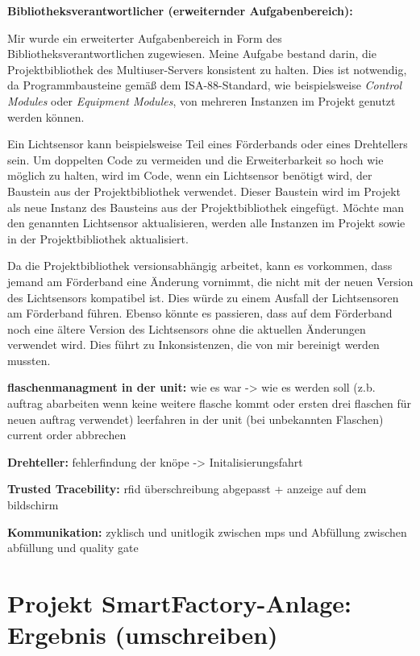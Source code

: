\textbf{Bibliotheksverantwortlicher (erweiternder Aufgabenbereich):} 

Mir wurde ein erweiterter Aufgabenbereich in Form des Bibliotheksverantwortlichen zugewiesen. Meine Aufgabe bestand darin, 
die Projektbibliothek des Multiuser-Servers konsistent zu halten. Dies ist notwendig, da Programmbausteine gemäß dem 
ISA-88-Standard, wie beispielsweise \textit{Control Modules} oder \textit{Equipment Modules}, von mehreren Instanzen im 
Projekt genutzt werden können.

Ein Lichtsensor kann beispielsweise Teil eines Förderbands oder eines Drehtellers sein. Um doppelten Code zu vermeiden und 
die Erweiterbarkeit so hoch wie möglich zu halten, wird im Code, wenn ein Lichtsensor benötigt wird, der Baustein aus der 
Projektbibliothek verwendet. Dieser Baustein wird im Projekt als neue Instanz des Bausteins aus der Projektbibliothek 
eingefügt. Möchte man den genannten Lichtsensor aktualisieren, werden alle Instanzen im Projekt sowie in der 
Projektbibliothek aktualisiert.

Da die Projektbibliothek versionsabhängig arbeitet, kann es vorkommen, dass jemand am Förderband eine Änderung vornimmt, die 
nicht mit der neuen Version des Lichtsensors kompatibel ist. Dies würde zu einem Ausfall der Lichtsensoren am Förderband 
führen. Ebenso könnte es passieren, dass auf dem Förderband noch eine ältere Version des Lichtsensors ohne die aktuellen 
Änderungen verwendet wird. Dies führt zu Inkonsistenzen, die von mir bereinigt werden mussten.

\textbf{flaschenmanagment in der unit:} 
wie es war -> wie es werden soll (z.b. auftrag abarbeiten wenn keine weitere flasche kommt oder ersten drei flaschen für neuen auftrag verwendet)
leerfahren in der unit (bei unbekannten Flaschen)
current order abbrechen 

\textbf{Drehteller:} 
fehlerfindung der knöpe -> Initalisierungsfahrt 

\textbf{Trusted Tracebility:} 
rfid überschreibung abgepasst + anzeige auf dem bildschirm 

\textbf{Kommunikation:} 
zyklisch und unitlogik zwischen mps und Abfüllung 
zwischen abfüllung und quality gate 

\section{Projekt SmartFactory-Anlage: Ergebnis (umschreiben)}

